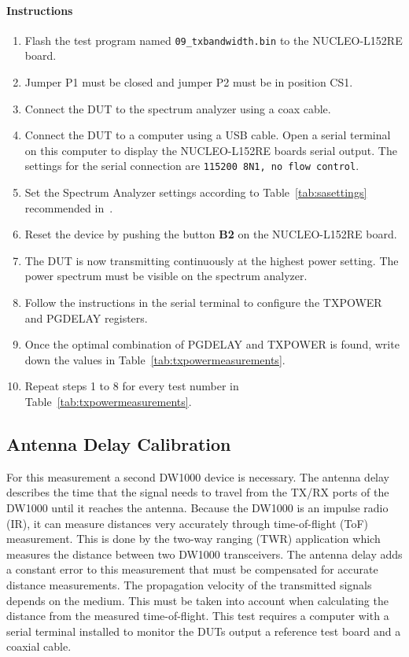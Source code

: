 \documentclass[journal,comsoc]{IEEEtran}
\begin{document}
\paragraph{Instructions}
\begin{enumerate}
	\item Flash the test program named \texttt{09\_txbandwidth.bin} to the NUCLEO-L152RE board. 
	\item Jumper P1 must be closed and jumper P2 must be in position CS1. 
	\item Connect the DUT to the spectrum analyzer using a coax cable.
	\item Connect the DUT to a computer using a USB cable. Open a serial terminal on this computer to display the NUCLEO-L152RE boards serial output. The settings for the serial connection are \texttt{115200 8N1, no flow control}.
	\item Set the Spectrum Analyzer settings according to Table~\ref{tab:sasettings} recommended in~\cite[Section 8.2]{dw1000um}. 
	\item Reset the device by pushing the button \textbf{B2} on the NUCLEO-L152RE board.
	\item The DUT is now transmitting continuously at the highest power setting. The power spectrum must be visible on the spectrum analyzer.
	\item Follow the instructions in the serial terminal to configure the TXPOWER and PGDELAY registers. 
	\item Once the optimal combination of PGDELAY and TXPOWER is found, write down the values in Table~\ref{tab:txpowermeasurements}.
	\item Repeat steps 1 to 8 for every test number in Table~\ref{tab:txpowermeasurements}.
\end{enumerate}

\subsection{Antenna Delay Calibration}
\label{subsec:antennadelay}
For this measurement a second DW1000 device is necessary. The antenna delay describes the time that the signal needs to travel from the TX/RX ports of the DW1000 until it reaches the antenna.
Because the DW1000 is an impulse radio (IR), it can measure distances very accurately through time-of-flight (ToF) measurement. This is done by the two-way ranging (TWR) application which measures the distance between two DW1000 transceivers. The antenna delay adds a constant error to this measurement that must be compensated for accurate distance measurements. The propagation velocity of the transmitted signals depends on the medium. This must be taken into account when calculating the distance from the measured time-of-flight.
This test requires a computer with a serial terminal installed to monitor the DUTs output a reference test board and a coaxial cable.
\end{document}
